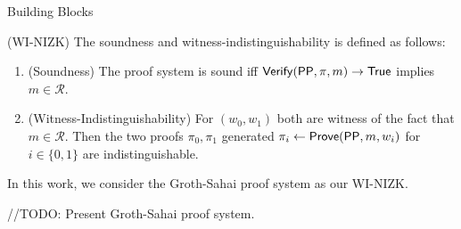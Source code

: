 \begin{subsection}{Building Blocks}
\begin{myDef}{(WI-NIZK)}
      The soundness and witness-indistinguishability is defined as follows:
      \begin{enumerate}
      \item (Soundness) The proof system is sound iff ${\mathsf{Verify}}(\mathsf{PP}, \pi, m) \to \mathsf{True}$ implies $m \in \mathcal{R}$.
      \item (Witness-Indistinguishability) For $(w_0, w_1)$ both are witness of the fact that $m \in \mathcal{R}$. Then the two proofs $\pi_0, \pi_1$ generated $\pi_i \gets {\mathsf{Prove}}(\mathsf{PP}, m, w_i)$ for $i \in \{0,1\}$ are indistinguishable.
      \end{enumerate}
      
     
      
    \end{myDef}

  
    In this work, we consider the Groth-Sahai proof system as our WI-NIZK.

    //TODO: Present Groth-Sahai proof system.
  

\end{subsection}












